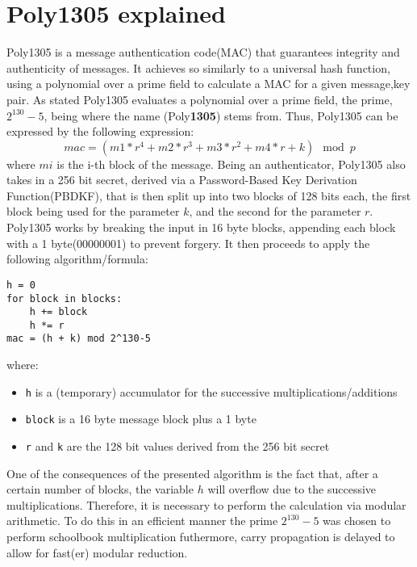 \documentclass[twocolumn]{article}
\begin{document}
\section{Poly1305 explained}
\label{poly135_101}
Poly1305 is a message authentication code(MAC) that guarantees integrity and authenticity of messages. It achieves so similarly to a universal hash function, using a 
polynomial over a prime field to calculate a MAC for a given message,key pair. As stated Poly1305 evaluates a polynomial over a prime field, the prime, $2^{130}-5$, 
being where the name (Poly\textbf{1305}) stems from. Thus, Poly1305 can be expressed by the following expression: 
$$mac = (m1 * r^4 + m2 * r^3 + m3 * r^2 + m4 * r + k) \mod{p} $$ 
where $mi$ is the i-th block of the message. Being an authenticator, Poly1305 also takes in a 256 bit secret, derived via a Password-Based Key Derivation Function(PBDKF), 
that is then split up into two blocks of 128 bits each, the first block being used for the parameter $k$, and the second for the parameter $r$. Poly1305 works by breaking 
the input in 16 byte blocks, appending each block with a 1 byte(00000001) to prevent forgery. It then proceeds to apply the following algorithm/formula:

\begin{verbatim}
h = 0
for block in blocks:
    h += block
    h *= r
mac = (h + k) mod 2^130-5
\end{verbatim}

where:
\begin{itemize}
    \item \texttt{h} is a (temporary) accumulator for the successive multiplications/additions
    \item \texttt{block} is a 16 byte message block plus a 1 byte
    \item \texttt{r} and \texttt{k} are the 128 bit values derived from the 256 bit secret
\end{itemize}

One of the consequences of the presented algorithm is the fact that, after a certain number of blocks, the variable $h$ will overflow due to the successive multiplications.
Therefore, it is necessary to perform the calculation via modular arithmetic. To do this in an efficient manner the prime $2^{130}-5$ was chosen to perform schoolbook 
multiplication futhermore, carry propagation is delayed to allow for fast(er) modular reduction.
\end{document}
